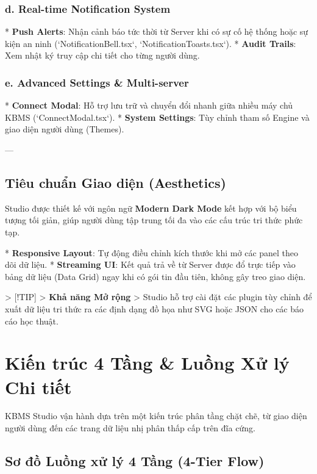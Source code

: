 \subsubsection{d. Real-time Notification System}
*   \textbf{Push Alerts}: Nhận cảnh báo tức thời từ Server khi có sự cố hệ thống hoặc sự kiện an ninh (`NotificationBell.tsx`, `NotificationToasts.tsx`).
*   \textbf{Audit Trails}: Xem nhật ký truy cập chi tiết cho từng người dùng.

\subsubsection{e. Advanced Settings & Multi-server}
*   \textbf{Connect Modal}: Hỗ trợ lưu trữ và chuyển đổi nhanh giữa nhiều máy chủ KBMS (`ConnectModal.tsx`).
*   \textbf{System Settings}: Tùy chỉnh tham số Engine và giao diện người dùng (Themes).

---

\subsection{Tiêu chuẩn Giao diện (Aesthetics)}

Studio được thiết kế với ngôn ngữ \textbf{Modern Dark Mode} kết hợp với bộ biểu tượng tối giản, giúp người dùng tập trung tối đa vào các cấu trúc tri thức phức tạp.

*   \textbf{Responsive Layout}: Tự động điều chỉnh kích thước khi mở các panel theo dõi dữ liệu.
*   \textbf{Streaming UI}: Kết quả trả về từ Server được đổ trực tiếp vào bảng dữ liệu (Data Grid) ngay khi có gói tin đầu tiên, không gây treo giao diện.

> [!TIP]
> \textbf{Khả năng Mở rộng}
> Studio hỗ trợ cài đặt các plugin tùy chỉnh để xuất dữ liệu tri thức ra các định dạng đồ họa như SVG hoặc JSON cho các báo cáo học thuật. 🎨

\section{Kiến trúc 4 Tầng & Luồng Xử lý Chi tiết}

KBMS Studio vận hành dựa trên một kiến trúc phân tầng chặt chẽ, từ giao diện người dùng đến các trang dữ liệu nhị phân thấp cấp trên đĩa cứng.

\subsection{Sơ đồ Luồng xử lý 4 Tầng (4-Tier Flow)}

